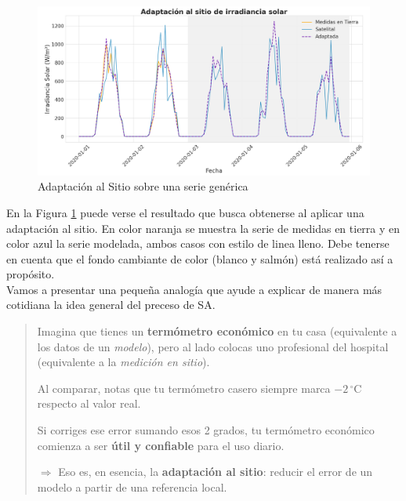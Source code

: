 \begin{figure}
    \centering
    \includegraphics[width=0.97\linewidth]{figuras/siteAdaptation.png}
    \caption{Adaptación al Sitio sobre una serie genérica}
    \label{fig:site-adapation}
\end{figure}

En la Figura \ref{fig:site-adapation} puede verse el resultado que busca obtenerse al aplicar una adaptación al sitio. En color naranja se muestra la serie de medidas en tierra y en color azul la serie modelada, ambos casos con estilo de linea lleno. Debe tenerse en cuenta que el fondo cambiante de color (blanco y salmón) está realizado así a propósito.\\ 

Vamos a presentar una pequeña analogía que ayude a explicar de manera más cotidiana la idea general del preceso de SA.
\begin{quote}
Imagina que tienes un \textbf{termómetro económico} en tu casa (equivalente a los datos de un \textit{modelo}), 
pero al lado colocas uno profesional del hospital (equivalente a la \textit{medición en sitio}).  

Al comparar, notas que tu termómetro casero siempre marca \(-2\,^{\circ}\mathrm{C}\) respecto al valor real.  

Si corriges ese error sumando esos 2 grados, tu termómetro económico comienza a ser \textbf{útil y confiable} para el uso diario.  

\medskip
$\Rightarrow$ Eso es, en esencia, la \textbf{adaptación al sitio}: reducir el error de un modelo a partir de  una referencia local.
\end{quote}



